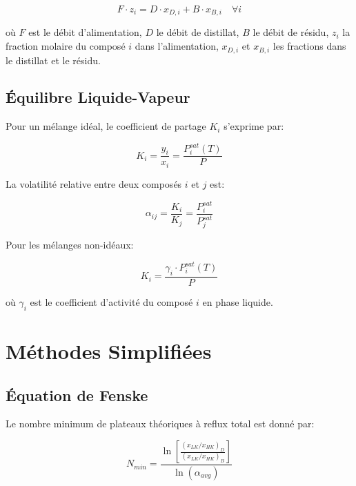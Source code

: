 \documentclass[11pt,a4paper]{article}
\begin{document}
\begin{equation}
F \cdot z_i = D \cdot x_{D,i} + B \cdot x_{B,i} \quad \forall i
\end{equation}

où $F$ est le débit d'alimentation, $D$ le débit de distillat, $B$ le débit de résidu, $z_i$ la fraction molaire du composé $i$ dans l'alimentation, $x_{D,i}$ et $x_{B,i}$ les fractions dans le distillat et le résidu.

\subsection{Équilibre Liquide-Vapeur}

Pour un mélange idéal, le coefficient de partage $K_i$ s'exprime par:

\begin{equation}
K_i = \frac{y_i}{x_i} = \frac{P_i^{sat}(T)}{P}
\end{equation}

La volatilité relative entre deux composés $i$ et $j$ est:

\begin{equation}
\alpha_{ij} = \frac{K_i}{K_j} = \frac{P_i^{sat}}{P_j^{sat}}
\end{equation}

Pour les mélanges non-idéaux:

\begin{equation}
K_i = \frac{\gamma_i \cdot P_i^{sat}(T)}{P}
\end{equation}

où $\gamma_i$ est le coefficient d'activité du composé $i$ en phase liquide.

\section{Méthodes Simplifiées}

\subsection{Équation de Fenske}

Le nombre minimum de plateaux théoriques à reflux total est donné par:

\begin{equation}
N_{min} = \frac{\ln\left[\frac{(x_{LK}/x_{HK})_D}{(x_{LK}/x_{HK})_B}\right]}{\ln(\alpha_{avg})}
\end{equation}
\end{document}
